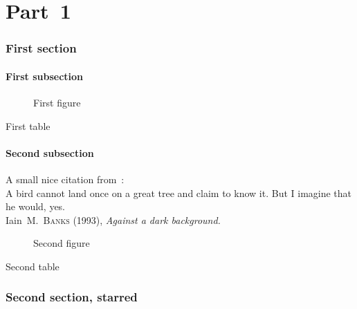\documentclass[oneside,12pt,a4paper]{article}
\begin{document}
\doparttoc \dopartlof \dopartlot
\dosecttoc \dosectlof \dosectlot
\setcounter{tocdepth}{6}
\setcounter{parttocdepth}{6}
\setcounter{secttocdepth}{6}
\tableofcontents \mtcaddsection
\listoffigures   \mtcaddsection
\listoftables    \mtcaddsection
\part{Part~1}
\parttoc \mtcskip \partlof \mtcskip \partlot

\section{First section}
\secttoc \mtcskip \sectlof \mtcskip \sectlot
\subsection{First subsection}

\begin{figure}[tp] \caption{First figure} \end{figure}
\begin{table}[tp] \caption{First table} \end{table}

\subsection{Second subsection}
A small nice citation from~\cite{dark}:\\
%
%
%
%
%
%
A bird cannot land once on a great tree and claim to know it.
But I imagine that he would, yes.\\
\hbox{}\hfill Iain~M.~\textsc{Banks} (1993), \textsl{Against a dark background.}%
\begin{figure}[tp] \caption{Second figure} \end{figure}
\begin{table} \caption{Second table} \end{table}
\section*{Second section, starred}
\end{document}
